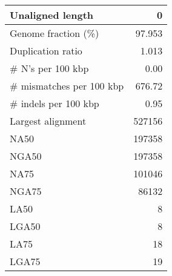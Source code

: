 \documentclass[12pt,a4paper]{article}
\begin{document}
\begin{table}[ht]
\begin{center}
\begin{tabular}{|l*{1}{|r}|}
Unaligned length & 0 \\ \hline
Genome fraction (\%) & 97.953 \\ \hline
Duplication ratio & 1.013 \\ \hline
\# N's per 100 kbp & 0.00 \\ \hline
\# mismatches per 100 kbp & 676.72 \\ \hline
\# indels per 100 kbp & 0.95 \\ \hline
Largest alignment & 527156 \\ \hline
NA50 & 197358 \\ \hline
NGA50 & 197358 \\ \hline
NA75 & 101046 \\ \hline
NGA75 & 86132 \\ \hline
LA50 & 8 \\ \hline
LGA50 & 8 \\ \hline
LA75 & 18 \\ \hline
LGA75 & 19 \\ \hline
\end{tabular}
\end{center}
\end{table}
\end{document}
